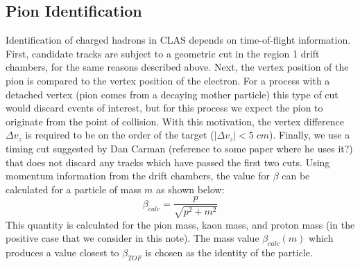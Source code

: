 \subsection{Pion Identification}
Identification of charged hadrons in CLAS depends on time-of-flight information.  First, candidate tracks are subject to a geometric cut in the region 1 drift chambers, for the same reasons described above.  Next, the vertex position of the pion is compared to the vertex position of the electron.  For a process with a detached vertex (pion comes from a decaying mother particle) this type of cut would discard events of interest, but for this process we expect the pion to originate from the point of collision.  With this motivation, the vertex difference $\Delta v_{z}$ is required to be on the order of the target ($|\Delta v_{z}| < 5 \; cm$).  Finally, we use a timing cut suggested by Dan Carman (reference to some paper where he uses it?) that does not discard any tracks which have passed the first two cuts.  Using momentum information from the drift chambers, the value for $\beta$ can be calculated for a particle of mass $m$ as shown below: 
\begin{equation}
	\beta_{calc} = \frac{p}{\sqrt{p^2 + m^2}}
\end{equation}
This quantity is calculated for the pion mass, kaon mass, and proton mass (in the positive case that we consider in this note).  The mass value $\beta_{calc}(m)$ which produces a value closest to $\beta_{TOF}$ is chosen as the identity of the particle.
    




